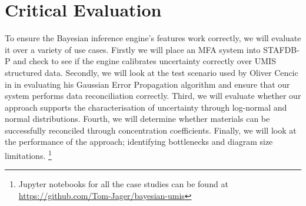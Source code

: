 \documentclass[ %
                    author={Tom Jager},
                supervisor={Dr. Daniel Schien},
                    degree={MEng},
                     title={A Bayesian Inference Engine for Calibrating Uncertainty over UMIS Structured MFA Systems},
                  subtitle={},
                      type={research},
                      year={2019} ]{dissertation}
\begin{document}

\chapter{Critical Evaluation}
\label{chap:evaluation}

To ensure the Bayesian inference engine's features work correctly, we will evaluate it over a variety of use cases. Firstly we will place an MFA system into STAFDB-P and check to see if the engine calibrates uncertainty correctly over UMIS structured data. Secondly, we will look at the test scenario used by Oliver Cencic in \cite{cencic2016nonlinear} in evaluating his Gaussian Error Propagation algorithm and ensure that our system performs data reconciliation correctly. Third, we will evaluate whether our approach supports the characterisation of uncertainty through log-normal and normal distributions. Fourth, we will determine whether materials can be successfully reconciled through concentration coefficients. Finally, we will look at the performance of the approach; identifying bottlenecks and diagram size limitations. \footnote{Jupyter notebooks for all the case studies can be found at \url{https://github.com/Tom-Jager/bayesian-umis}}
\end{document}
